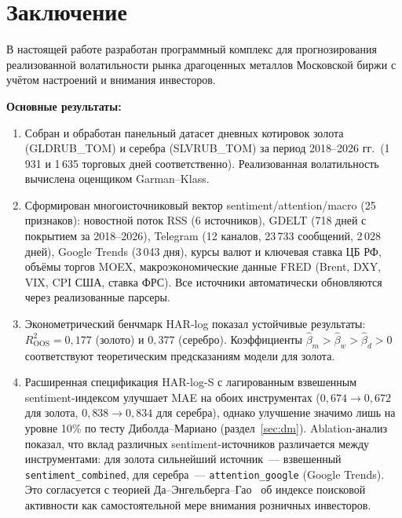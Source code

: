 \section{Заключение}

В настоящей работе разработан программный комплекс для прогнозирования
реализованной волатильности рынка драгоценных металлов Московской биржи
с учётом настроений и внимания инвесторов.

\textbf{Основные результаты:}

\begin{enumerate}
    \item Собран и обработан панельный датасет дневных котировок золота (GLDRUB\_TOM)
          и серебра (SLVRUB\_TOM) за период 2018--2026 гг.\ (1\,931 и 1\,635 торговых дней
          соответственно). Реализованная волатильность вычислена оценщиком Garman--Klass.

    \item Сформирован многоисточниковый вектор sentiment/attention/macro (25 признаков):
          новостной поток RSS (6 источников), GDELT (718 дней с покрытием за 2018--2026),
          Telegram (12 каналов, 23\,733 сообщений, 2\,028 дней),
          Google Trends (3\,043 дня), курсы валют и ключевая ставка ЦБ РФ,
          объёмы торгов MOEX, макроэкономические данные FRED (Brent, DXY, VIX, CPI США, ставка ФРС).
          Все источники автоматически обновляются через реализованные парсеры.

    \item Эконометрический бенчмарк HAR-log показал устойчивые результаты:
          $R^2_{\mathrm{OOS}} = 0{,}177$ (золото) и $0{,}377$ (серебро).
          Коэффициенты $\hat\beta_m > \hat\beta_w > \hat\beta_d > 0$
          соответствуют теоретическим предсказаниям модели для золота.

    \item Расширенная спецификация HAR-log-S с лагированным взвешенным
          sentiment-индексом улучшает MAE на обоих инструментах
          ($0{,}674 \to 0{,}672$ для золота, $0{,}838 \to 0{,}834$ для серебра),
          однако улучшение значимо лишь на уровне 10\% по тесту
          Диболда--Мариано (раздел~\ref{sec:dm}).
          Ablation-анализ показал, что вклад различных sentiment-источников
          различается между инструментами: для золота сильнейший источник~---
          взвешенный \texttt{sentiment\_combined}, для серебра~---
          \texttt{attention\_google} (Google Trends).
          Это согласуется с теорией Да--Энгельберга--Гао~\cite{Da2011}
          об индексе поисковой активности как самостоятельной мере
          внимания розничных инвесторов.


\end{enumerate}
